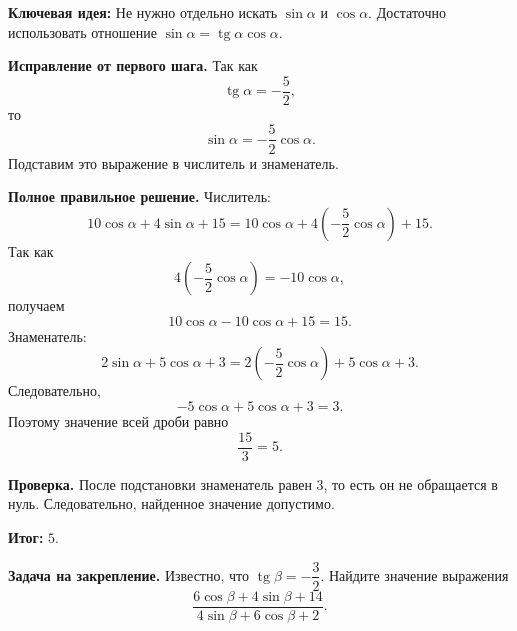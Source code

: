 \documentclass[12pt,a4paper]{article}
\newcommand{\keyidea}{\textcolor{blue!60!black}{\textbf{Ключевая идея:}}}
\newcommand{\resultlabel}{\textcolor{teal!60!black}{\textbf{Итог:}}}
\begin{document}
\keyidea{} Не нужно отдельно искать $\sin\alpha$ и $\cos\alpha$. Достаточно использовать отношение $\sin\alpha=\operatorname{tg}\alpha\cos\alpha$.

\textbf{Исправление от первого шага.} Так как
\[
\operatorname{tg}\alpha=-\frac52,
\]
то
\[
\sin\alpha=-\frac52\cos\alpha.
\]
Подставим это выражение в числитель и знаменатель.

\textbf{Полное правильное решение.} Числитель:
\[
10\cos\alpha+4\sin\alpha+15
=10\cos\alpha+4\left(-\frac52\cos\alpha\right)+15.
\]
Так как
\[
4\left(-\frac52\cos\alpha\right)=-10\cos\alpha,
\]
получаем
\[
10\cos\alpha-10\cos\alpha+15=15.
\]
Знаменатель:
\[
2\sin\alpha+5\cos\alpha+3
=2\left(-\frac52\cos\alpha\right)+5\cos\alpha+3.
\]
Следовательно,
\[
-5\cos\alpha+5\cos\alpha+3=3.
\]
Поэтому значение всей дроби равно
\[
\frac{15}{3}=5.
\]

\textbf{Проверка.} После подстановки знаменатель равен $3$, то есть он не обращается в нуль. Следовательно, найденное значение допустимо.

\resultlabel{} $\boxed{5}$.

\textbf{Задача на закрепление.} Известно, что $\operatorname{tg}\beta=-\dfrac32$. Найдите значение выражения
\[
\frac{6\cos\beta+4\sin\beta+14}{4\sin\beta+6\cos\beta+2}.
\]
\end{document}
